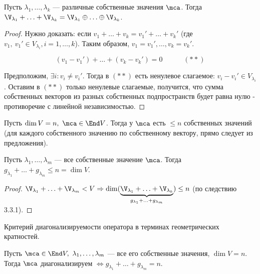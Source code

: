 \documentclass[main]{subfiles}
\begin{document}
\begin{corollary}
    Пусть $\lambda_1, \ldots, \lambda_k$ — различные собственные значения $\mca$.
    Тогда   $\V_{\lambda_1} + \ldots + \V_{\lambda_k} =
        \V_{\lambda_1} \oplus \ldots \oplus  \V_{\lambda_k}$.
\end{corollary}

\begin{proof}
    Нужно доказать: если $v_1 + \ldots + v_k = v_1' + \ldots + v_k'$
    (где $v_1,\ v_1' \in V_{\lambda_i}, i = 1, \ldots, k$).
    Таким образом, $v_1 = v_1', \ldots, v_k = v_k'$.

    \[(v_1 - v_1') + \ldots + (v_k - v_k') = 0 \quad \quad \quad (**)\]

    Предположим, $\exists i : v_i \neq v_i'$. Тогда в $(**)$  есть ненулевое слагаемое:
    $v_i - v_i' \in V_{\lambda_i}$. Оставим в $(**)$ только ненулевые
    слагаемые, получится, что сумма собственных векторов из разных собственных подпространств будет равна нулю - противоречие с линейной независимостью.
\end{proof}

\begin{corollary}
    Пусть $\dim V = n,\ \mca \in \End V$. Тогда у  $\mca$ есть $\le n$ собственных значений (для каждого собственного значению по собственному вектору, прямо следует из предложения).
\end{corollary}

\begin{corollary}
    Пусть $\lambda_1, \ldots, \lambda_m$ — все собственные значение $\mca$.
    Тогда $g_{\lambda_1} + \ldots + g_{\lambda_m} \le n = \dim V$.
\end{corollary}

\begin{proof}
    $\V_{\lambda_1} + \ldots + \V_{\lambda_m} < V
        \Rightarrow \dim (\underbrace{\V_{\lambda_1} + \ldots + \V_{\lambda_k}}_{g_{\lambda_1} + \ldots + g_{\lambda_m}}) \leq n$ (по следствию 3.3.1).
\end{proof}

\begin{proposition}
    Критерий диагонализируемости оператора в терминах геометрических кратностей.

    Пусть $\mca \in \End V,\ \lambda_1, \ldots, \lambda_m$  — все его собственные значения,
    $\dim V = n$. Тогда $\mca$  диагонализируем $\Leftrightarrow
        g_{\lambda_1} + \ldots +  g_{\lambda_m} = n$.
\end{proposition}
\end{document}
